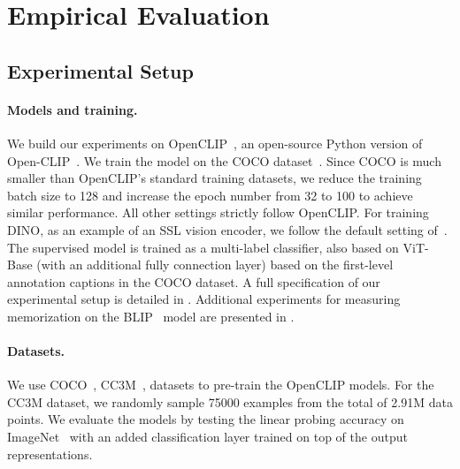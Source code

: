 \section{Empirical Evaluation}

\subsection{Experimental Setup}

\paragraph{Models and training.}
We build our experiments on OpenCLIP~\citep{cherti2023}, an open-source Python version of Open-CLIP~\citep{ilharco_gabriel_2021_5143773}. 
We train the model on the COCO dataset~\citep{cocodataset}.
Since COCO is much smaller than OpenCLIP's standard training datasets, we reduce the training batch size to 128 and increase the epoch number from 32 to 100 to achieve similar performance. All other settings strictly follow OpenCLIP. 
For training DINO, as an example of an SSL vision encoder, we follow the default setting of~\citet{caron2021dino}. The supervised model is trained as  a multi-label classifier, also based on ViT-Base (with an additional fully connection layer) based on the first-level annotation captions in the COCO dataset.
A full specification of our experimental setup is detailed in . 
Additional experiments for measuring memorization on the BLIP~\citep{li2022blip} model are presented in .

\paragraph{Datasets.} We use COCO~\citep{cocodataset}, CC3M~\citep{sharma2018conceptual},  datasets to pre-train the OpenCLIP models.
For the CC3M dataset, we randomly sample 75000 examples from the total of 2.91M data points. %
We evaluate the models by testing the linear probing accuracy on ImageNet~\citep{deng2009imagenet} with an added classification layer trained on top of the output representations. 

